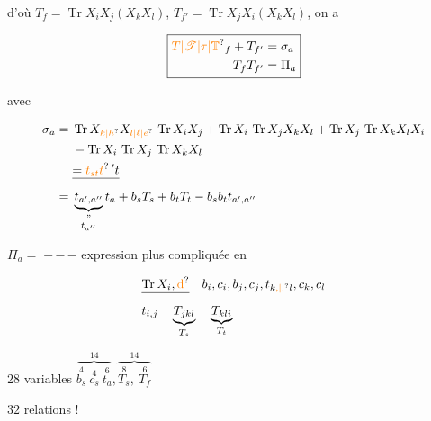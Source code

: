 
 d'où $T_f=\operatorname{Tr}X_iX_j(X_kX_l)$, $T_{f'}=\operatorname{Tr}X_jX_i(X_kX_l)$, on a


\[
 \boxed{\begin{aligned}
 \unsure{T|\mathscr T|\tau|\mathbb T}_f+T_{f'}&=\sigma_a\\
 T_fT_{f'}&=\Pi_a
 \end{aligned}}
\]

avec

\[
 \begin{aligned}
 \sigma_a={}&\operatorname{Tr}X_{\unsure{k|h}}X_{\unsure{l|\ell|e}}\,\operatorname{Tr}X_iX_j+
 \operatorname{Tr}X_i\,\operatorname{Tr}X_jX_kX_l+
 \operatorname{Tr}X_j\,\operatorname{Tr}X_kX_lX_i\\
 &-\operatorname{Tr}X_i\,\operatorname{Tr}X_j\,\operatorname{Tr}X_kX_l\\
 &\deleted{=\unsure{t_{st}t}\,'t}\\
 ={}&\underbrace{t_{a',a''}}_{\substack{\text{''}\\t_{a''}}}t_a+b_sT_s+b_tT_t-b_sb_tt_{a',a''}
 \end{aligned}
\]

$\Pi_a=\;\mathord{-}\,\mathord{-}\,\mathord{-}$ expression  plus compliquée en

\[
 \begin{aligned}
 &\deleted{\operatorname{Tr}X_i,\unsure{\mathrm d}}\quad b_i,c_i,b_j,c_j,t_{k\unsure{,|.}l},c_k,c_l\\
 &t_{i,j}\quad\underbrace{T_{jkl}}_{T_s}\quad\underbrace{T_{kli}}_{T_t}
 \end{aligned}
\]

$28$ variables $\overbrace{\overset{4}{b_s}\ \overset{4}{c_s}\ \overset{6}{t_a}}^{14}, \overbrace{\overset{8}{T_s},\ \overset{6}{T_f}}^{14}$

$32$ relations !

